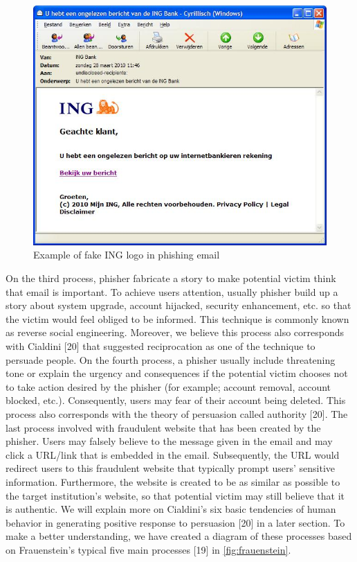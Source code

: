 \begin{figure}
\begin{centering}
\includegraphics[scale=0.4]{gfx/ing-phishing}
\par\end{centering}

\protect\caption{\label{fig:ing}Example of fake ING logo in phishing email}
\end{figure}


On the third process, phisher fabricate a story to make potential
victim think that email is important. To achieve users attention,
usually phisher build up a story about system upgrade, account hijacked,
security enhancement, etc. so that the victim would feel obliged to
be informed. This technique is commonly known as reverse social engineering.
Moreover, we believe this process also corresponds with Cialdini {[}20{]}
that suggested reciprocation as one of the technique to persuade people.
On the fourth process, a phisher usually include threatening tone
or explain the urgency and consequences if the potential victim chooses
not to take action desired by the phisher (for example; account removal,
account blocked, etc.). Consequently, users may fear of their account
being deleted. This process also corresponds with the theory of persuasion
called authority {[}20{]}. The last process involved with fraudulent
website that has been created by the phisher. Users may falsely believe
to the message given in the email and may click a URL/link that is
embedded in the email. Subsequently, the URL would redirect users
to this fraudulent website that typically prompt users\textquoteright{}
sensitive information. Furthermore, the website is created to be as
similar as possible to the target institution\textquoteright s website,
so that potential victim may still believe that it is authentic. We
will explain more on Cialdini\textquoteright s six basic tendencies
of human behavior in generating positive response to persuasion {[}20{]}
in a later section. To make a better understanding, we have created
a diagram of these processes based on Frauenstein\textquoteright s
typical five main processes {[}19{]} in \autoref{fig:frauenstein}.

